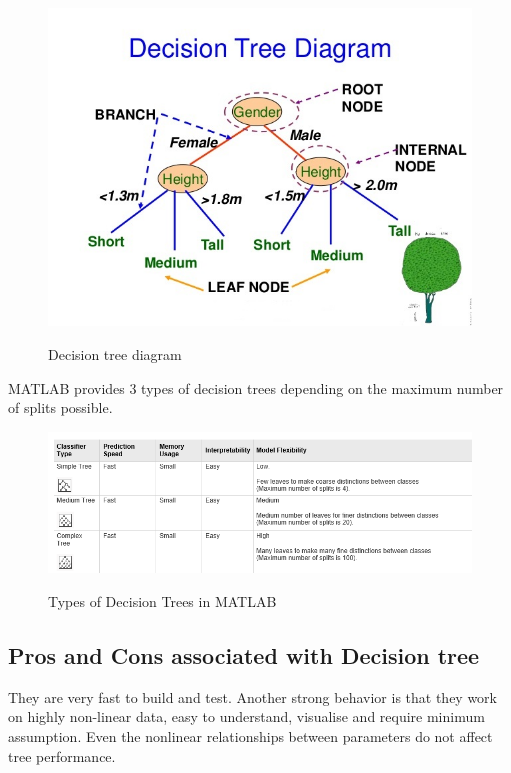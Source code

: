 \begin{figure}[H]
\centering
{\includegraphics[scale=0.48]{dt.jpg}}
\caption{Decision tree diagram}
\end{figure}

\noindent MATLAB provides 3 types of decision trees depending on the maximum number of splits possible.


\begin{figure}[H]
\centering
{\includegraphics[scale=0.8]{table.png}}
\caption{Types of Decision Trees in MATLAB}
\end{figure}

\newpage
\subsection{Pros and Cons associated with Decision tree} \label{Pros and Cons associated with Decision tree}

\noindent They are very fast to build and test. Another strong behavior is that they work on highly non-linear data, easy to understand, visualise and require minimum assumption. Even the nonlinear relationships between parameters do not affect tree performance.

